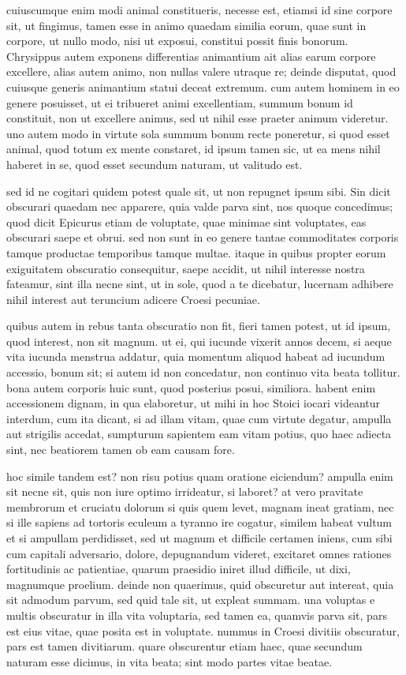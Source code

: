  cuiuscumque enim modi animal constitueris, necesse est, etiamsi id sine corpore sit, ut fingimus, tamen esse in animo quaedam similia eorum, quae sunt in corpore, ut nullo modo, nisi ut exposui, constitui possit finis bonorum. Chrysippus autem exponens differentias animantium ait alias earum corpore excellere, alias autem animo, non nullas valere utraque re; deinde disputat, quod cuiusque generis animantium statui deceat extremum. cum autem hominem in eo genere posuisset, ut ei tribueret animi excellentiam, summum bonum id constituit, non ut excellere animus, sed ut nihil esse praeter animum videretur. uno autem modo in virtute sola summum bonum recte poneretur, si quod esset animal, quod totum ex mente constaret, id ipsum tamen sic, ut ea mens nihil haberet in se, quod esset secundum naturam, ut valitudo est.

 sed id ne cogitari quidem potest quale sit, ut non repugnet ipsum sibi. Sin dicit obscurari quaedam nec apparere, quia valde parva sint, nos quoque concedimus; quod dicit Epicurus etiam de voluptate, quae minimae sint voluptates, eas obscurari saepe et obrui. sed non sunt in eo genere tantae commoditates corporis tamque productae temporibus tamque multae. itaque in quibus propter eorum exiguitatem obscuratio consequitur, saepe accidit, ut nihil interesse nostra fateamur, sint illa necne sint, ut in sole, quod a te dicebatur, lucernam adhibere nihil interest aut teruncium adicere Croesi pecuniae.

 quibus autem in rebus tanta obscuratio non fit, fieri tamen potest, ut id ipsum, quod interest, non sit magnum. ut ei, qui iucunde vixerit annos decem, si aeque vita iucunda menstrua addatur, quia momentum aliquod habeat ad iucundum accessio, bonum sit; si autem id non concedatur, non continuo vita beata tollitur. bona autem corporis huic sunt, quod posterius posui, similiora. habent enim accessionem dignam, in qua elaboretur, ut mihi in hoc Stoici iocari videantur interdum, cum ita dicant, si ad illam vitam, quae cum virtute degatur, ampulla aut strigilis accedat, sumpturum sapientem eam vitam potius, quo haec adiecta sint, nec beatiorem tamen ob eam causam fore.

 hoc simile tandem est? non risu potius quam oratione eiciendum? ampulla enim sit necne sit, quis non iure optimo irrideatur, si laboret? at vero pravitate membrorum et cruciatu dolorum si quis quem levet, magnam ineat gratiam, nec si ille sapiens ad tortoris eculeum a tyranno ire cogatur, similem habeat vultum et si ampullam perdidisset, sed ut magnum et difficile certamen iniens, cum sibi cum capitali adversario, dolore, depugnandum videret, excitaret omnes rationes fortitudinis ac patientiae, quarum praesidio iniret illud difficile, ut dixi, magnumque proelium. deinde non quaerimus, quid obscuretur aut intereat, quia sit admodum parvum, sed quid tale sit, ut expleat summam. una voluptas e multis obscuratur in illa vita voluptaria, sed tamen ea, quamvis parva sit, pars est eius vitae, quae posita est in voluptate. nummus in Croesi divitiis obscuratur, pars est tamen divitiarum. quare obscurentur etiam haec, quae secundum naturam esse dicimus, in vita beata; sint modo partes vitae beatae.


